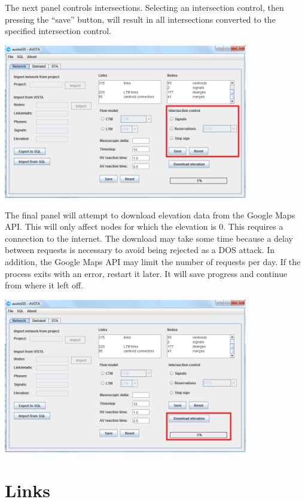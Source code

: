 The next panel controls intersections. Selecting an intersection control, then pressing the ``save'' button, will result in all intersections converted to the specified intersection control.
\begin{center}
\includegraphics[width=0.8\textwidth]{images/nodes2.png}
\end{center}

The final panel will attempt to download elevation data from the Google Maps API. This will only affect nodes for which the elevation is 0. This requires a connection to the internet. The download may take some time because a delay between requests is necessary to avoid being rejected as a DOS attack. In addition, the Google Maps API may limit the number of requests per day. If the process exits with an error, restart it later. It will save progress and continue from where it left off.
\begin{center}
\includegraphics[width=0.8\textwidth]{images/nodes3.png}
\end{center}





\section{Links}
\label{sec:links}

